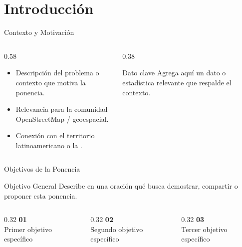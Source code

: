 
\section{Introducción}

\begin{frame}{Contexto y Motivación}
  \begin{columns}[T]
    \begin{column}{0.58\textwidth}
      \begin{itemize}
        \item Descripción del problema o contexto que motiva la ponencia.
        \item Relevancia para la comunidad OpenStreetMap / geoespacial.
        \item Conexión con el territorio latinoamericano o la \cdmx.
      \end{itemize}
    \end{column}
    \begin{column}{0.38\textwidth}
      \begin{block}{Dato clave}
        Agrega aquí un dato o estadística relevante que respalde el contexto.
      \end{block}
    \end{column}
  \end{columns}
\end{frame}

\begin{frame}{Objetivos de la Ponencia}
  \begin{block}{Objetivo General}
    Describe en una oración qué busca demostrar, compartir o proponer esta ponencia.
  \end{block}
  \vspace{0.4cm}
  \begin{columns}[T]
    \begin{column}{0.32\textwidth}
      \centering
      {\color{SotmVerde}\Large\textbf{01}}\\[0.1cm]
      {\small Primer objetivo específico}
    \end{column}
    \begin{column}{0.32\textwidth}
      \centering
      {\color{SotmVerde}\Large\textbf{02}}\\[0.1cm]
      {\small Segundo objetivo específico}
    \end{column}
    \begin{column}{0.32\textwidth}
      \centering
      {\color{SotmVerde}\Large\textbf{03}}\\[0.1cm]
      {\small Tercer objetivo específico}
    \end{column}
  \end{columns}
\end{frame}

